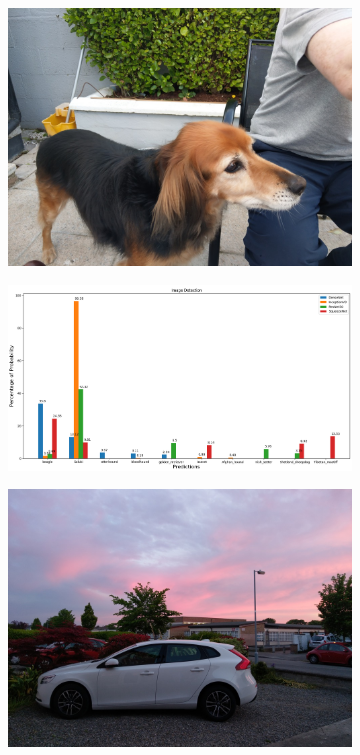    \begin{figure}[H]
      \centering
      \captionsetup{justification=centering}
      \begin{subfigure}{0.25\textwidth}
      \includegraphics[width=\textwidth]{Sections/4InitialWork/4_images/run1_pic.jpg} 
      \end{subfigure}
      \begin{subfigure}{0.74\textwidth}
      \includegraphics[width=\textwidth]{Sections/4InitialWork/4_images/run1_res.png}
      \end{subfigure}
      \centering
      \captionsetup{justification=centering}
      \begin{subfigure}{0.25\textwidth}
      \includegraphics[width=\textwidth]{Sections/4InitialWork/4_images/run3_pic.jpg} 

\end{subfigure}
\end{figure}

